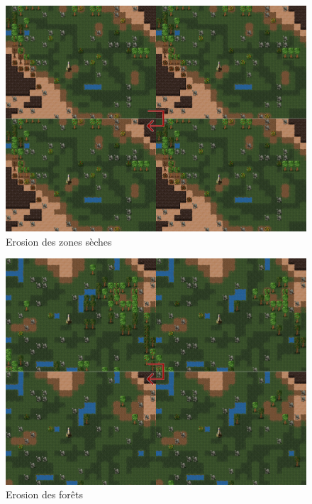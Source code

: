 \documentclass[a4paper]{article}
\begin{document}
          \begin{figure}
            \begin{center}
              \includegraphics[scale=0.2]{img/ErodeNearCliff.png}
            \end{center}
            \caption{Erosion des zones sèches}
          \end{figure}
          \begin{figure}
            \begin{center}
              \includegraphics[scale=0.2]{img/ErodeForest.png}
            \end{center}
            \caption{Erosion des forêts}
          \end{figure}
        
\end{document}
